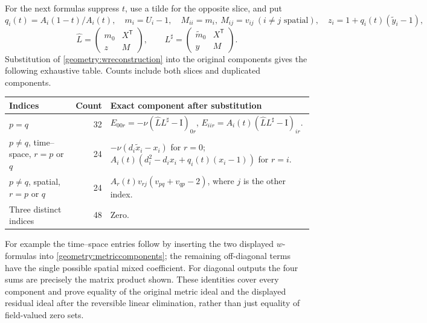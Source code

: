\documentclass[11pt,a4paper]{article}
\theoremstyle{remark}\newtheorem{remark}[theorem]{Remark}
\newcommand{\Id}{\mathrm I}\newcommand{\F}{\mathbb F}
\begin{document}
For the next formulas suppress \(t\), use a tilde for the opposite
slice, and put
\[
 q_i(t)=A_i(1-t)/A_i(t),\quad m_i=U_i-1,\quad
 M_{ii}=m_i,\ M_{ij}=v_{ij}\ (i\ne j\text{ spatial}),\quad
 z_i=1+q_i(t)(\widetilde y_i-1),
\]
\[
 \widehat L=\begin{pmatrix}m_0&X^{\mathsf T}\\z&M\end{pmatrix},\qquad
 L^\sharp=\begin{pmatrix}\widetilde m_0&X^{\mathsf T}\\y&M\end{pmatrix}.
\]
Substitution of \eqref{geometry:wreconstruction} into the original
components gives the following exhaustive table. Counts include both
slices and duplicated components.
\begin{center}\small
\begin{tabular}{p{.31\linewidth}rp{.55\linewidth}}
\hline
Indices&Count&Exact component after substitution\\\hline
\(p=q\)&32&
\(E_{00r}=-\nu(\widehat LL^\sharp-\Id)_{0r}\),
\(E_{iir}=A_i(t)(\widehat LL^\sharp-\Id)_{ir}\).\\
\(p\ne q\), time--space, \(r=p\) or \(q\)&24&
\(-\nu(d_i\widetilde x_i-x_i)\) for \(r=0\);
\(A_i(t)(d_i^2-d_ix_i+q_i(t)(x_i-1))\) for \(r=i\).\\
\(p\ne q\), spatial, \(r=p\) or \(q\)&24&
\(A_r(t)v_{rj}(v_{pq}+v_{qp}-2)\), where \(j\) is the other index.\\
Three distinct indices&48&Zero.\\\hline
\end{tabular}
\end{center}
For example the time--space entries follow by inserting the two displayed
\(w\)-formulas into \eqref{geometry:metriccomponents}; the remaining
off-diagonal terms have the single possible spatial mixed coefficient.
For diagonal outputs the four sums are precisely the matrix product shown.
These identities cover every component and prove equality of the original
metric ideal and the displayed residual ideal after the reversible linear
elimination, rather than just equality of field-valued zero sets.
\end{document}
